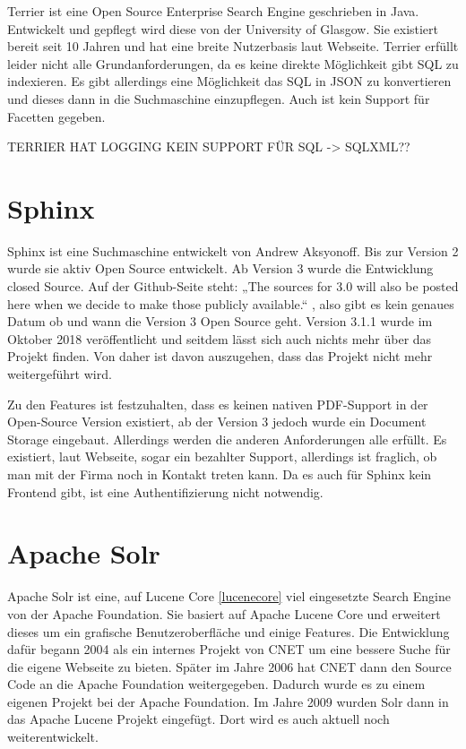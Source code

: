 Terrier ist eine Open Source Enterprise Search Engine geschrieben in Java. Entwickelt und gepflegt wird diese von der University of Glasgow. Sie existiert bereit seit 10 Jahren und hat eine breite Nutzerbasis laut Webseite. 
Terrier erfüllt leider nicht alle Grundanforderungen, da es keine direkte Möglichkeit gibt SQL zu indexieren. Es gibt allerdings eine Möglichkeit das SQL in JSON zu konvertieren und dieses dann in die Suchmaschine einzupflegen. Auch ist kein Support für Facetten gegeben.


\cite{McCreadie.2019}

TERRIER HAT LOGGING
KEIN SUPPORT FÜR SQL -> SQLXML??

\section{Sphinx}
\label{sphinx}

Sphinx ist eine Suchmaschine entwickelt von Andrew Aksyonoff. Bis zur Version 2 wurde sie aktiv Open Source entwickelt. Ab Version 3 wurde die Entwicklung closed Source. Auf der Github-Seite steht: „The sources for 3.0 will also be posted here when we decide to make those publicly available.“ \cite{sphinxserach.2019}, also gibt es kein genaues Datum ob und wann die Version 3 Open Source geht. Version 3.1.1 wurde im Oktober 2018 veröffentlicht und seitdem lässt sich auch nichts mehr über das Projekt finden. Von daher ist davon auszugehen, dass das Projekt nicht mehr weitergeführt wird. 

Zu den Features ist festzuhalten, dass es keinen nativen PDF-Support in der Open-Source Version existiert, ab der Version 3 jedoch wurde ein Document Storage eingebaut. Allerdings werden die anderen Anforderungen alle erfüllt. Es existiert, laut Webseite, sogar ein bezahlter Support, allerdings ist fraglich, ob man mit der Firma noch in Kontakt treten kann. Da es auch für Sphinx kein Frontend gibt, ist eine Authentifizierung nicht notwendig.
\cite{SphinxTechnologiesInc.2019}

\section{Apache Solr}

Apache Solr ist eine, auf Lucene Core \ref{lucenecore} viel eingesetzte Search Engine von der Apache Foundation. Sie basiert auf Apache Lucene Core und erweitert dieses um ein grafische Benutzeroberfläche und einige Features. 
Die Entwicklung dafür begann 2004 als ein internes Projekt von CNET um eine bessere Suche für die eigene Webseite zu bieten. Später im Jahre 2006 hat CNET dann den Source Code an die Apache Foundation weitergegeben. Dadurch wurde  es zu einem eigenen Projekt bei der Apache Foundation. Im Jahre 2009 wurden Solr dann in das Apache Lucene Projekt eingefügt. Dort wird es auch aktuell noch weiterentwickelt.
\cite{Wikipedia.2019b}

